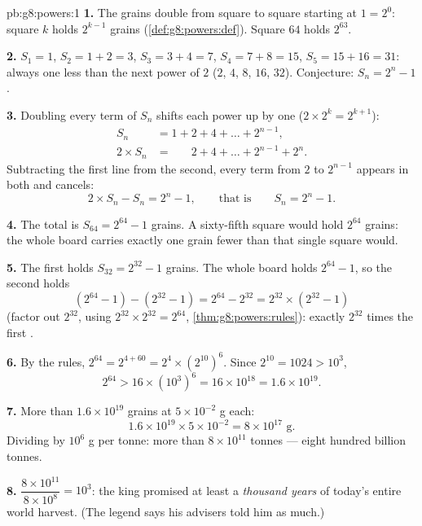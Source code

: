\begin{solution}{pb:g8:powers:1}
\textbf{1.} The grains double from square to square starting at
$1 = 2^0$: square $k$ holds $2^{k-1}$ grains
(\cref{def:g8:powers:def}). Square $64$ holds $2^{63}$.

\textbf{2.} $S_1 = 1$, $S_2 = 1 + 2 = 3$, $S_3 = 3 + 4 = 7$,
$S_4 = 7 + 8 = 15$, $S_5 = 15 + 16 = 31$: always one less than
the next power of $2$ ($2$, $4$, $8$, $16$, $32$). Conjecture:
$S_n = 2^n - 1$.

\textbf{3.} Doubling every term of $S_n$ shifts each power up by
one ($2 \times 2^{k} = 2^{k+1}$):
\begin{align*}
S_n &= 1 + 2 + 4 + \dots + 2^{n-1}, \\
2 \times S_n &= \phantom{1 + {}} 2 + 4 + \dots + 2^{n-1} + 2^n .
\end{align*}
Subtracting the first line from the second, every term from $2$
to $2^{n-1}$ appears in both and cancels:
\[
2 \times S_n - S_n = 2^n - 1,
\qquad\text{that is}\qquad
S_n = 2^n - 1 .
\]

\textbf{4.} The total is $S_{64} = 2^{64} - 1$ grains. A
sixty-fifth square would hold $2^{64}$ grains: the whole board
carries exactly one grain fewer than that single square would.

\textbf{5.} The first  holds $S_{32} = 2^{32} - 1$ grains.
The whole board holds $2^{64} - 1$, so the second  holds
\[
\left(2^{64} - 1\right) - \left(2^{32} - 1\right)
= 2^{64} - 2^{32}
= 2^{32} \times \left(2^{32} - 1\right)
\]
(factor out $2^{32}$, using $2^{32} \times 2^{32} = 2^{64}$,
\cref{thm:g8:powers:rules}): exactly $2^{32}$ times the first
.

\textbf{6.} By the  rules, $2^{64} = 2^{4 + 60} =
2^4 \times \left(2^{10}\right)^6$. Since $2^{10} = 1024 > 10^3$,
\[
2^{64} > 16 \times \left(10^3\right)^6 = 16 \times 10^{18}
= 1.6 \times 10^{19} .
\]

\textbf{7.} More than $1.6 \times 10^{19}$ grains at
$5 \times 10^{-2}$ g each:
\[
1.6 \times 10^{19} \times 5 \times 10^{-2}
= 8 \times 10^{17} \text{ g} .
\]
Dividing by $10^6$ g per tonne: more than $8 \times 10^{11}$
tonnes --- eight hundred billion tonnes.

\textbf{8.} $\dfrac{8 \times 10^{11}}{8 \times 10^{8}} = 10^3$:
the king promised at least a \emph{thousand years} of today's
entire world harvest. (The legend says his advisers told him as
much.)


\end{solution}
